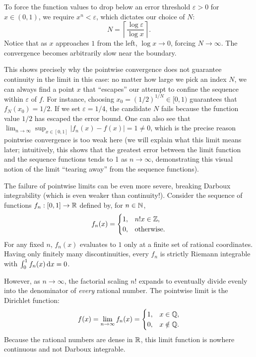 \documentclass[../analysis1.tex]{subfiles}
\begin{document}
\begin{example}
\begin{center}
\begin{tikzpicture}[scale=2.8]
      \end{tikzpicture}
    \end{center}
    To force the function values to drop below an error threshold $\varepsilon > 0$ for $x \in (0,1)$, we require $x^n < \varepsilon$, which dictates our choice of $N$:
    \[
        N = \left\lceil \frac{\log \varepsilon}{\log x} \right\rceil.
    \]
    Notice that as $x$ approaches $1$ from the left, $\log x \to 0$, forcing $N \to \infty$. The convergence becomes arbitrarily slow near the boundary. 
    
    This shows precisely why the pointwise convergence does not guarantee continuity in the limit in this case: no matter how large we pick an index $N$, we can always find a point $x$ that ``escapes'' our attempt to confine the sequence within $\varepsilon$ of $f$. For instance, choosing $x_0 = (1/2)^{1/N} \in [0,1)$ guarantees that $f_N(x_0) = 1/2$. If we set $\varepsilon = 1/4$, the candidate $N$ fails because the function value $1/2$ has escaped the error bound. One can also see that $\lim_{n \to \infty} \sup_{x \in[0,1]} |f_n(x) - f(x)| = 1 \neq 0$, which is the precise reason pointwise convergence is too weak here (we will explain what this limit means later; intuitively, this shows that the greatest error between the limit function and the sequence functions tends to 1 as $n\to\infty$, demonstrating this visual notion of the limit ``tearing away'' from the sequence functions). 
\end{example}

\begin{example}
    The failure of pointwise limits can be even more severe, breaking Darboux integrability (which is even weaker than continuity!). Consider the sequence of functions $f_n:[0,1]\to\mathbb{R}$ defined by, for $n\in\mathbb{N}$,
    \[
        f_n(x) = \begin{cases} 1, & n!x \in \mathbb{Z}, \\ 0, & \text{otherwise}. \end{cases}
    \]
    For any fixed $n$, $f_n(x)$ evaluates to $1$ only at a finite set of rational coordinates. Having only finitely many discontinuities, every $f_n$ is strictly Riemann integrable with $\int_0^1 f_n(x) \d{x} = 0$. 
    
    However, as $n \to \infty$, the factorial scaling $n!$ expands to eventually divide evenly into the denominator of \textit{every} rational number. The pointwise limit is the Dirichlet function:
    \[
        f(x) = \lim_{n \to \infty} f_n(x) = \begin{cases} 1, & x \in \mathbb{Q}, \\ 0, & x \notin \mathbb{Q}. \end{cases}
    \]
    Because the rational numbers are dense in $\mathbb{R}$, this limit function is nowhere continuous and not Darboux integrable.
\end{example}
\end{document}
